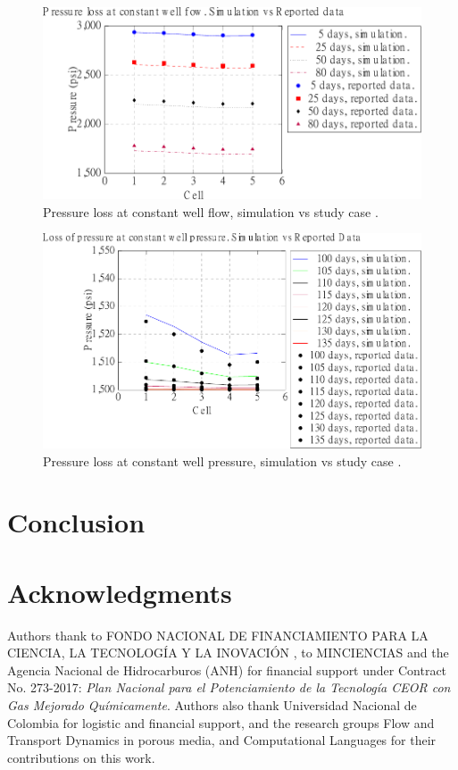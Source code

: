 \documentclass[review]{elsarticle}
\begin{document}
\begin{figure}
	\centering
	\includegraphics[width=1.0\textwidth]{Figures/Validation1.pdf}
	\caption{Pressure loss at constant well flow, simulation vs study case \cite{jamal2006petroleum}.}
	\label{fig:validation1}
\end{figure}

\begin{figure}
	\centering
	\includegraphics[width=1.0\textwidth]{Figures/Validation2.pdf}
	\caption{Pressure loss at constant well pressure, simulation vs study case \cite{jamal2006petroleum}.}
	\label{fig:validation2}
\end{figure}


\section{Conclusion}\label{sec:conclusions}

\section*{Acknowledgments}
Authors thank to FONDO NACIONAL DE FINANCIAMIENTO PARA LA CIENCIA, LA TECNOLOG\'{I}A Y LA INOVACI\'{O}N , to MINCIENCIAS and the Agencia Nacional de Hidrocarburos (ANH) for financial support under Contract No. 273-2017: \textit{Plan Nacional para el Potenciamiento de la Tecnolog\'{i}a CEOR con Gas Mejorado Qu\'{i}micamente}. Authors also thank Universidad Nacional de Colombia for logistic and financial support, and the research groups Flow and Transport Dynamics in porous media, and Computational Languages for their contributions on this work.


\end{document}
